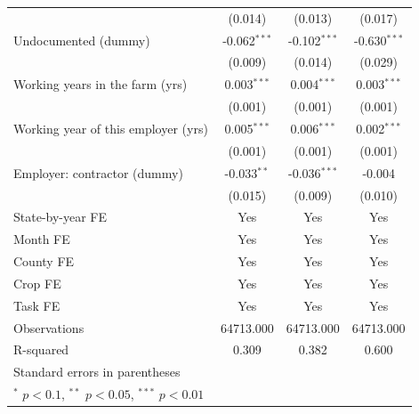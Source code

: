 \documentclass[12pt]{article}
\newcommand{\sym}[1]{\ensuremath{^{#1}}}
\begin{document}
\begin{appendices}
\begin{table}[h!]
\begin{tabular}{l*{3}{c}}
                    &     (0.014)         &     (0.013)         &     (0.017)         \\
Undocumented (dummy)&      -0.062\sym{***}&      -0.102\sym{***}&      -0.630\sym{***}\\
                    &     (0.009)         &     (0.014)         &     (0.029)         \\
Working years in the farm (yrs)&       0.003\sym{***}&       0.004\sym{***}&       0.003\sym{***}\\
                    &     (0.001)         &     (0.001)         &     (0.001)         \\
Working year of this employer (yrs)&       0.005\sym{***}&       0.006\sym{***}&       0.002\sym{***}\\
                    &     (0.001)         &     (0.001)         &     (0.001)         \\
Employer: contractor (dummy)&      -0.033\sym{**} &      -0.036\sym{***}&      -0.004         \\
                    &     (0.015)         &     (0.009)         &     (0.010)         \\
\hline
State-by-year FE    &         Yes         &         Yes         &         Yes         \\
Month FE            &         Yes         &         Yes         &         Yes         \\
County FE           &         Yes         &         Yes         &         Yes         \\
Crop FE             &         Yes         &         Yes         &         Yes         \\
Task FE             &         Yes         &         Yes         &         Yes         \\
Observations        &   64713.000         &   64713.000         &   64713.000         \\
R-squared           &       0.309         &       0.382         &       0.600         \\
\hline\hline
\multicolumn{4}{l}{\footnotesize Standard errors in parentheses}\\
\multicolumn{4}{l}{\footnotesize \sym{*} \(p<0.1\), \sym{**} \(p<0.05\), \sym{***} \(p<0.01\)}\\
\end{tabular}
\end{table}

\clearpage

\end{appendices}
\end{document}
